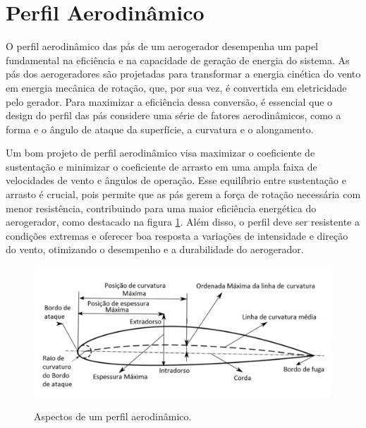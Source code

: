 \section{Perfil Aerodinâmico}
    \par O perfil aerodinâmico das pás de um aerogerador desempenha um papel fundamental na eficiência e na capacidade de geração de energia do sistema. As pás dos aerogeradores são projetadas para transformar a energia cinética do vento em energia mecânica de rotação, que, por sua vez, é convertida em eletricidade pelo gerador. Para maximizar a eficiência dessa conversão, é essencial que o design do perfil das pás considere uma série de fatores aerodinâmicos, como a forma e o ângulo de ataque da superfície, a curvatura e o alongamento.

    \par Um bom projeto de perfil aerodinâmico visa maximizar o coeficiente de sustentação e minimizar o coeficiente de arrasto em uma ampla faixa de velocidades de vento e ângulos de operação. Esse equilíbrio entre sustentação e arrasto é crucial, pois permite que as pás gerem a força de rotação necessária com menor resistência, contribuindo para uma maior eficiência energética do aerogerador, como destacado na figura \ref{fig:Aspectos de um perfil aerodinâmico.}. Além disso, o perfil deve ser resistente a condições extremas e oferecer boa resposta a variações de intensidade e direção do vento, otimizando o desempenho e a durabilidade do aerogerador.

        \begin{figure}
            \centering
            \caption{Aspectos de um perfil aerodinâmico.}
            \includegraphics[width=0.7\linewidth]{Figuras//Teorico/PerfilAerodinamico01.png}
            \label{fig:Aspectos de um perfil aerodinâmico.}
        \end{figure}
        
